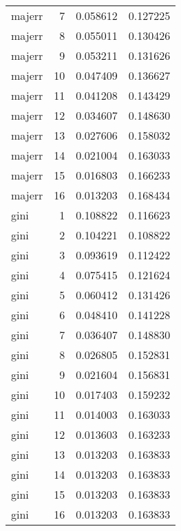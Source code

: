 \begin{longtable}{lrrr}
  majerr &          7 &     0.058612 &    0.127225 \\
  majerr &          8 &     0.055011 &    0.130426 \\
  majerr &          9 &     0.053211 &    0.131626 \\
  majerr &         10 &     0.047409 &    0.136627 \\
  majerr &         11 &     0.041208 &    0.143429 \\
  majerr &         12 &     0.034607 &    0.148630 \\
  majerr &         13 &     0.027606 &    0.158032 \\
  majerr &         14 &     0.021004 &    0.163033 \\
  majerr &         15 &     0.016803 &    0.166233 \\
  majerr &         16 &     0.013203 &    0.168434 \\
    gini &          1 &     0.108822 &    0.116623 \\
    gini &          2 &     0.104221 &    0.108822 \\
    gini &          3 &     0.093619 &    0.112422 \\
    gini &          4 &     0.075415 &    0.121624 \\
    gini &          5 &     0.060412 &    0.131426 \\
    gini &          6 &     0.048410 &    0.141228 \\
    gini &          7 &     0.036407 &    0.148830 \\
    gini &          8 &     0.026805 &    0.152831 \\
    gini &          9 &     0.021604 &    0.156831 \\
    gini &         10 &     0.017403 &    0.159232 \\
    gini &         11 &     0.014003 &    0.163033 \\
    gini &         12 &     0.013603 &    0.163233 \\
    gini &         13 &     0.013203 &    0.163833 \\
    gini &         14 &     0.013203 &    0.163833 \\
    gini &         15 &     0.013203 &    0.163833 \\
    gini &         16 &     0.013203 &    0.163833 \\
\end{longtable}
